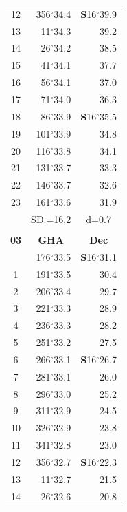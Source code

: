 \documentclass[10pt, a4paper]{report}
\begin{document}
\begin{scriptsize}
\begin{tabular*}{0.2\textwidth}[t]{@{\extracolsep{\fill}}|c|rr|}
12 & 356$^\circ$34.4 & \textbf{S}16$^\circ$39.9\\
13 & 11$^\circ$34.3 & 39.2\\
14 & 26$^\circ$34.2 & 38.5\\
15 & 41$^\circ$34.1 & \raisebox{0.24ex}{\boldmath$\cdot$~\boldmath$\cdot$~~}37.7\\
16 & 56$^\circ$34.1 & 37.0\\
17 & 71$^\circ$34.0 & 36.3\\[2Pt]
18 & 86$^\circ$33.9 & \textbf{S}16$^\circ$35.5\\
19 & 101$^\circ$33.9 & 34.8\\
20 & 116$^\circ$33.8 & 34.1\\
21 & 131$^\circ$33.7 & \raisebox{0.24ex}{\boldmath$\cdot$~\boldmath$\cdot$~~}33.3\\
22 & 146$^\circ$33.7 & 32.6\\
23 & 161$^\circ$33.6 & 31.9\\
\hline
\rule{0pt}{2.4ex} & \multicolumn{1}{c}{SD.=16.2} & \multicolumn{1}{c|}{d=0.7}\\
\hline
\multicolumn{1}{c}{}\\[-0.5ex]\hline
\multicolumn{1}{|c|}{\rule{0pt}{2.6ex}\textbf{03}} & \multicolumn{1}{c}{\textbf{GHA}} & \multicolumn{1}{c|}{\textbf{Dec}}\\
\hline\rule{0pt}{2.6ex}\noindent
0 & 176$^\circ$33.5 & \textbf{S}16$^\circ$31.1\\
1 & 191$^\circ$33.5 & 30.4\\
2 & 206$^\circ$33.4 & 29.7\\
3 & 221$^\circ$33.3 & \raisebox{0.24ex}{\boldmath$\cdot$~\boldmath$\cdot$~~}28.9\\
4 & 236$^\circ$33.3 & 28.2\\
5 & 251$^\circ$33.2 & 27.5\\[2Pt]
6 & 266$^\circ$33.1 & \textbf{S}16$^\circ$26.7\\
7 & 281$^\circ$33.1 & 26.0\\
8 & 296$^\circ$33.0 & 25.2\\
9 & 311$^\circ$32.9 & \raisebox{0.24ex}{\boldmath$\cdot$~\boldmath$\cdot$~~}24.5\\
10 & 326$^\circ$32.9 & 23.8\\
11 & 341$^\circ$32.8 & 23.0\\[2Pt]
12 & 356$^\circ$32.7 & \textbf{S}16$^\circ$22.3\\
13 & 11$^\circ$32.7 & 21.5\\
14 & 26$^\circ$32.6 & 20.8\\

\end{tabular*}
\end{scriptsize}
\end{document}
